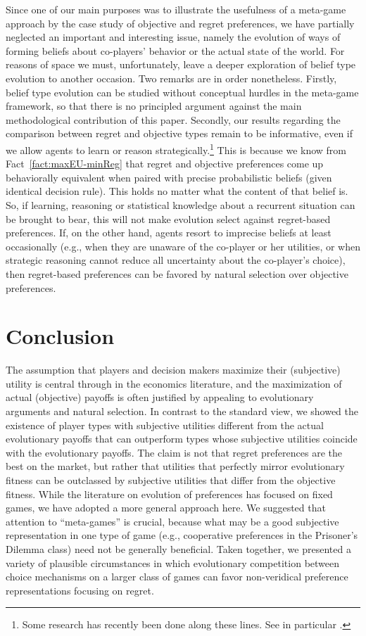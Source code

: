 \documentclass[fleqn,reqno,12pt]{article}
\theoremstyle{Satz}
\theoremstyle{Bsp}
\begin{document}
Since one of our main purposes was to illustrate the usefulness of a meta-game approach by the
case study of objective and regret preferences, we have partially neglected an important and
interesting issue, namely the evolution of ways of forming beliefs about co-players' behavior
or the actual state of the world. For reasons of space we must, unfortunately, leave a deeper
exploration of belief type evolution to another occasion. Two remarks are in order
nonetheless. Firstly, belief type evolution can be studied without conceptual hurdles in the
meta-game framework, so that there is no principled argument against the main methodological
contribution of this paper. Secondly, our results regarding the comparison between regret and
objective types remain to be informative, even if we allow agents to learn or reason
strategically.\footnote{Some research has recently been done along these lines. See in
  particular \cite{RobalinoRobson16,Mengel12,Mohlin12}.} This is because we know from
Fact~\ref{fact:maxEU-minReg} that regret and objective preferences come up behaviorally
equivalent when paired with precise probabilistic beliefs (given identical decision rule). This
holds no matter what the content of that belief is. So, if learning, reasoning or statistical
knowledge about a recurrent situation can be brought to bear, this will not make evolution
select against regret-based preferences. If, on the other hand, agents resort to imprecise
beliefs at least occasionally (e.g., when they are unaware of the co-player or her utilities,
or when strategic reasoning cannot reduce all uncertainty about the co-player's choice), then
regret-based preferences can be favored by natural selection over objective preferences.

\section{Conclusion} \label{sec:conclusion}


The assumption that players and decision makers maximize their (subjective) utility is central
through in the economics literature, and the maximization of actual (objective) payoffs is
often justified by appealing to evolutionary arguments and natural selection. In contrast to
the standard view, we showed the existence of player types with subjective utilities different
from the actual evolutionary payoffs that can outperform types whose subjective utilities
coincide with the evolutionary payoffs. The claim is not that regret preferences are the best
on the market, but rather that utilities that perfectly mirror evolutionary fitness can be
outclassed by subjective utilities that differ from the objective fitness.  While the
literature on evolution of preferences has focused on fixed games, we have adopted a more
general approach here. We suggested that attention to “meta-games” is crucial, because what may
be a good subjective representation in one type of game (e.g., cooperative preferences in the
Prisoner’s Dilemma class) need not be generally beneficial. Taken together, we presented a
variety of plausible circumstances in which evolutionary competition between choice mechanisms
on a larger class of games can favor non-veridical preference representations focusing on
regret.
\end{document}
